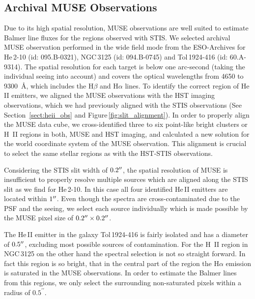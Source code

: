 \documentclass[]{aastex63}
\begin{document}
\subsection{Archival MUSE Observations}\label{sssect:muse}
Due to its high spatial resolution, MUSE observations are well suited to estimate Balmer line fluxes for the regions observed with STIS.
We selected archival MUSE observation performed in the wide field mode from the ESO-Archives for He\,2-10 (id: 095.B-0321), NGC\,3125 (id: 094.B-0745) and Tol\,1924-416 (id: 60.A-9314). 
The spatial resolution for each target is below one arc-second (taking the individual seeing into account) and covers the optical wavelengths from 4650 to 9300~\AA, which includes the H$\beta$ and H$\alpha$ lines.
To identify the correct region of He\,II emitters, we aligned the MUSE observations with the HST imaging observations, which we had previously aligned with the STIS observations (See Section~\ref{sect:heii_obs} and Figure\,\ref{fig:slit_alignment}). In order to properly align the MUSE data cube, we cross-identified three to six point-like bright clusters or H~II regions in both, MUSE and HST imaging, and calculated a new solution for the world coordinate system of the MUSE observation. This alignment is crucial to select the same stellar regions as with the HST-STIS observations.

Considering the STIS slit width of $0.2\mbox{$^{\prime\prime}$}$, the spatial resolution of MUSE is insufficient to properly resolve multiple sources which are aligned along the STIS slit as we find for He\,2-10. In this case all four identified He\,II emitters are located within $1\mbox{$^{\prime\prime}$}$. Even though the spectra are cross-contaminated due to the PSF and the seeing, we select each source individually which is made possible by the MUSE pixel size of $0.2\mbox{$^{\prime\prime}$}\times0.2\mbox{$^{\prime\prime}$}$.

The He\,II emitter in the galaxy Tol\,1924-416 is fairly isolated and has a diameter of $0.5\mbox{$^{\prime\prime}$}$, excluding most possible sources of contamination.
For the H~II region in NGC\,3125 on the other hand the spectral selection is not so straight forward. In fact this region is so bright, that in the central part of the region the H$\alpha$ emission is saturated in the MUSE observations. In order to estimate the Balmer lines from this regions, we only select the surrounding non-saturated pixels within a radius of $0.5^{\prime\prime}$.
\end{document}
